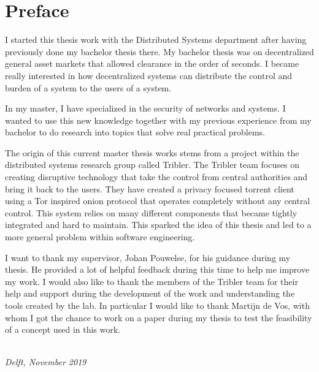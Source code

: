 \chapter*{Preface}

I started this thesis work with the Distributed Systems department after having previously done my bachelor thesis there. My bachelor thesis was on decentralized general asset markets that allowed clearance in the order of seconds. I became really interested in how decentralized systems can distribute the control and burden of a system to the users of a system.

In my master, I have specialized in the security of networks and systems. I wanted to use this new knowledge together with my previous experience from my bachelor to do research into topics that solve real practical problems.

The origin of this current master thesis works stems from a project within the distributed systems research group called Tribler. The Tribler team focuses on creating disruptive technology that take the control from central authorities and bring it back to the users. They have created a privacy focused torrent client using a Tor inspired onion protocol that operates completely without any central control. This system relies on many different components that became tightly integrated and hard to maintain. This sparked the idea of this thesis and led to a more general problem within software engineering.

I want to thank my supervisor, Johan Pouwelse, for his guidance during my thesis. He provided a lot of helpful feedback during this time to help me improve my work. I would also like to thank the members of the Tribler team for their help and support during the development of the work and understanding the tools created by the lab. In particular I would like to thank Martijn de Vos, with whom I got the chance to work on a paper during my thesis to test the feasibility of a concept used in this work.

\begin{flushright}
{\makeatletter\itshape
    \@author \\
    Delft, November 2019
\makeatother}
\end{flushright}

